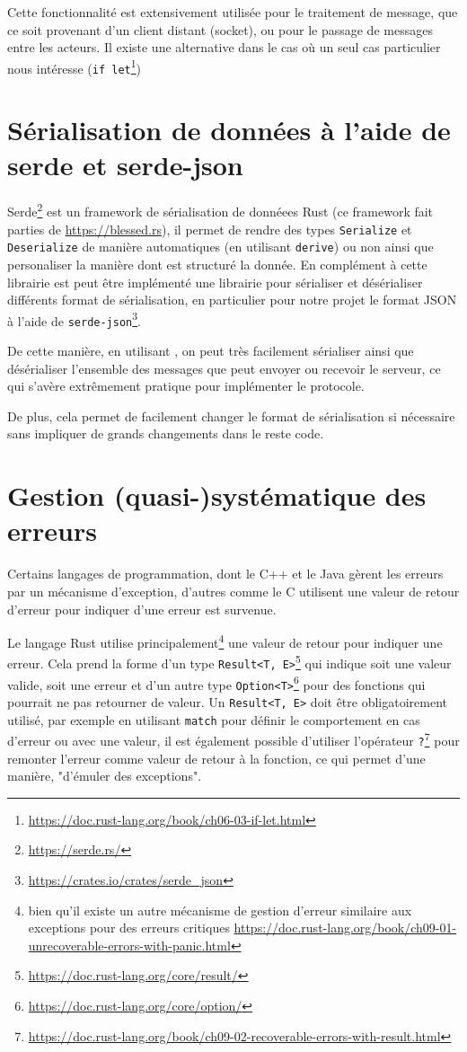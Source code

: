 \documentclass{EPUProjetDi}
\begin{document}
Cette fonctionnalité est extensivement utilisée pour le traitement de message, que ce soit provenant d'un client distant (socket), ou pour le passage de messages entre les acteurs. Il existe une alternative dans le cas où un seul cas particulier nous intéresse (\verb|if let|\footnote{\url{https://doc.rust-lang.org/book/ch06-03-if-let.html}})

\section{Sérialisation de données à l'aide de serde et serde-json}

Serde\footnote{\url{https://serde.rs/}} est un framework de sérialisation de donnéees Rust (ce framework fait parties de \url{https://blessed.rs}), il permet de rendre des types \verb|Serialize| et \verb|Deserialize| de manière automatiques (en utilisant \verb|derive|) ou non ainsi que personaliser la manière dont est structuré la donnée. En complément à cette librairie est peut être implémenté une librairie pour sérialiser et désérialiser différents format de sérialisation, en particulier pour notre projet le format JSON à l'aide de \verb|serde-json|\footnote{\url{https://crates.io/crates/serde_json}}.

De cette manière, en utilisant , on peut très facilement sérialiser ainsi que désérialiser l'ensemble des messages que peut envoyer ou recevoir le serveur, ce qui s'avère extrêmement pratique pour implémenter le protocole.

De plus, cela permet de facilement changer le format de sérialisation si nécessaire sans impliquer de grands changements dans le reste code.

\section{Gestion (quasi-)systématique des erreurs}

Certains langages de programmation, dont le C++ et le Java gèrent les erreurs par un mécanisme d'exception, d'autres comme le C utilisent une valeur de retour d'erreur pour indiquer d'une erreur est survenue.

Le langage Rust utilise principalement\footnote{bien qu'il existe un autre mécanisme de gestion d'erreur similaire aux exceptions pour des erreurs critiques \url{https://doc.rust-lang.org/book/ch09-01-unrecoverable-errors-with-panic.html}} une valeur de retour pour indiquer une erreur. Cela prend la forme d'un type \verb|Result<T, E>|\footnote{\url{https://doc.rust-lang.org/core/result/}} qui indique soit une valeur valide, soit une erreur et d'un autre type \verb|Option<T>|\footnote{\url{https://doc.rust-lang.org/core/option/}} pour des fonctions qui pourrait ne pas retourner de valeur. Un \verb|Result<T, E>| doit être obligatoirement utilisé, par exemple en utilisant \verb|match| pour définir le comportement en cas d'erreur ou avec une valeur, il est également possible d'utiliser l'opérateur \verb|?|\footnote{\url{https://doc.rust-lang.org/book/ch09-02-recoverable-errors-with-result.html}} pour remonter l'erreur comme valeur de retour à la fonction, ce qui permet d'une manière, "d'émuler des exceptions".
\end{document}
